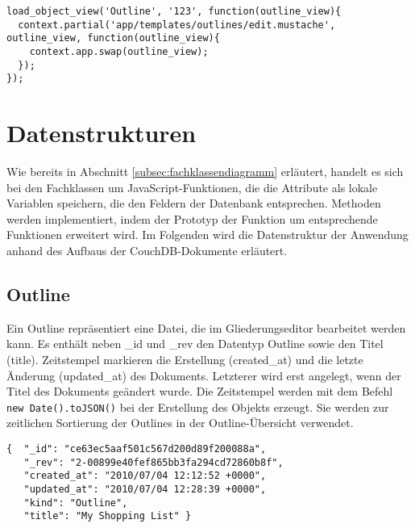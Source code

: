 \lstset{language=javascript}
\medskip 
\begin{lstlisting}[label=code:resources-apply, caption=Rendern des Templates zum Bearbeiten eines Outlines]
load_object_view('Outline', '123', function(outline_view){
  context.partial('app/templates/outlines/edit.mustache', outline_view, function(outline_view){
    context.app.swap(outline_view);
  });
});
\end{lstlisting}




\section{Datenstrukturen}
\label{sec:datenstruktur}

Wie bereits in Abschnitt \ref{subsec:fachklassendiagramm} erläutert, handelt es sich bei den Fachklassen um JavaScript-Funktionen, die die Attribute als lokale Variablen speichern, die den Feldern der Datenbank entsprechen. Methoden werden implementiert, indem der Prototyp der Funktion um entsprechende Funktionen erweitert wird. Im Folgenden wird die Datenstruktur der Anwendung anhand des Aufbaus der CouchDB-Dokumente erläutert.


\subsection{Outline}

Ein {\selectfont Outline} repräsentiert eine Datei, die im Gliederungseditor bearbeitet werden kann. Es enthält neben {\selectfont\_id} und {\selectfont\_rev} den Datentyp {\selectfont Outline} sowie den Titel ({\selectfont title}). Zeitstempel markieren die Erstellung ({\selectfont created\_at}) und die letzte Änderung ({\selectfont updated\_at}) des Dokuments. Letzterer wird erst angelegt, wenn der Titel des Dokuments geändert wurde. Die Zeitstempel werden mit dem Befehl \lstinline!new Date().toJSON()! bei der Erstellung des Objekts erzeugt. Sie werden zur zeitlichen Sortierung der Outlines in der Outline-Übersicht verwendet.

\medskip 
\begin{lstlisting}[label=code:outline-example, caption=Ein Outline-Dokument]
{  "_id": "ce63ec5aaf501c567d200d89f200088a",
   "_rev": "2-00899e40fef865bb3fa294cd72860b8f",
   "created_at": "2010/07/04 12:12:52 +0000",
   "updated_at": "2010/07/04 12:28:39 +0000",
   "kind": "Outline",
   "title": "My Shopping List" }
\end{lstlisting}


